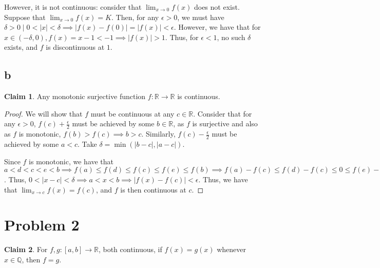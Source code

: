 \documentclass[12pt,letterpaper]{article}
\theoremstyle{definition}
\newtheorem*{claim}{Claim}
\newcommand{\R}{\mathbb{R}}
\newcommand{\Q}{\mathbb{Q}}
\begin{document}
However, it is not continuous: consider that $\lim_{x \rightarrow 0}f(x)$ does
not exist. Suppose that $\lim_{x\rightarrow 0}f(x) = K$. Then, for any $\epsilon
> 0$, we must have $\delta > 0 \mid 0 < |x| < \delta \implies |f(x) - f(0)| =
|f(x)| < \epsilon$. However, we have that for $x \in (-\delta,0), f(x) = x - 1 <
-1 \implies |f(x)| > 1$. Thus, for $\epsilon < 1$, no such $\delta$ exists, and
$f$ is discontinuous at $1$.

\subsection*{b}

\begin{claim}
  Any monotonic surjective function $f: \R \rightarrow \R$ is continuous.
\end{claim}

\begin{proof}
  We will show that $f$ must be continuous at any $c \in \R$. Consider that
  for any $\epsilon > 0$, $f(c) + \frac{\epsilon}{2}$ must be achieved by some $b \in \R$,
  as $f$ is surjective and also as $f$ is monotonic, $f(b) > f(c) \implies b > c$. Similarly, $f(c) -
  \frac{\epsilon}{2}$ must be achieved by some $a < c$. Take $\delta = \min(|b-c|,
  |a-c|)$. 

  Since $f$ is monotonic, we have that $a < d < c < e < b \implies f(a) \leq
  f(d) \leq f(c) \leq f(e) \leq f(b) \implies f(a) - f(c) \leq f(d) - f(c) \leq
  0 \leq f(e) - f(c) \leq f(b) - f(c) \implies -\frac{\epsilon}{2} \leq f(d) -
  f(c) < f(e) - f(c) \leq \frac{\epsilon}{2} \implies |f(d) - f(c)|, |f(e) -
  f(c)| \leq \frac{\epsilon}{2} < \epsilon$. Thus, $0 < |x-c| < \delta \implies
  a < x < b \implies |f(x) - f(c)| < \epsilon$. Thus, we have that
  $\lim_{x\rightarrow c}f(x) = f(c)$, and $f$ is then continuous at $c$.
\end{proof}

\section*{Problem 2}

\begin{claim}
  For $f,g:[a,b] \rightarrow \R$, both continuous, if $f(x) = g(x)$ whenever $x \in
  \Q$, then $f = g$.
\end{claim}
\end{document}
